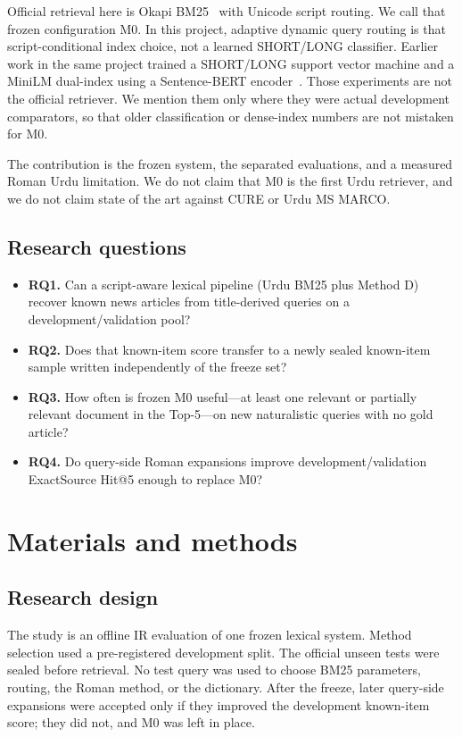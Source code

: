 \documentclass[10pt,letterpaper]{article}
\begin{document}
Official retrieval here is Okapi BM25~\cite{bib13} with Unicode script routing. We call that frozen configuration M0. In this project, adaptive dynamic query routing is that script-conditional index choice, not a learned SHORT/LONG classifier. Earlier work in the same project trained a SHORT/LONG support vector machine and a MiniLM dual-index using a Sentence-{BERT} encoder~\cite{bib14}. Those experiments are not the official retriever. We mention them only where they were actual development comparators, so that older classification or dense-index numbers are not mistaken for M0.

The contribution is the frozen system, the separated evaluations, and a measured Roman Urdu limitation. We do not claim that M0 is the first Urdu retriever, and we do not claim state of the art against CURE or Urdu MS MARCO.

\subsection*{Research questions}

\begin{itemize}
\item \textbf{RQ1.} Can a script-aware lexical pipeline (Urdu BM25 plus Method D) recover known news articles from title-derived queries on a development/validation pool?
\item \textbf{RQ2.} Does that known-item score transfer to a newly sealed known-item sample written independently of the freeze set?
\item \textbf{RQ3.} How often is frozen M0 useful---at least one relevant or partially relevant document in the Top-5---on new naturalistic queries with no gold article?
\item \textbf{RQ4.} Do query-side Roman expansions improve development/validation ExactSource Hit@5 enough to replace M0?
\end{itemize}

\section*{Materials and methods}
\subsection*{Research design}

The study is an offline IR evaluation of one frozen lexical system. Method selection used a pre-registered development split. The official unseen tests were sealed before retrieval. No test query was used to choose BM25 parameters, routing, the Roman method, or the dictionary. After the freeze, later query-side expansions were accepted only if they improved the development known-item score; they did not, and M0 was left in place.
\end{document}

